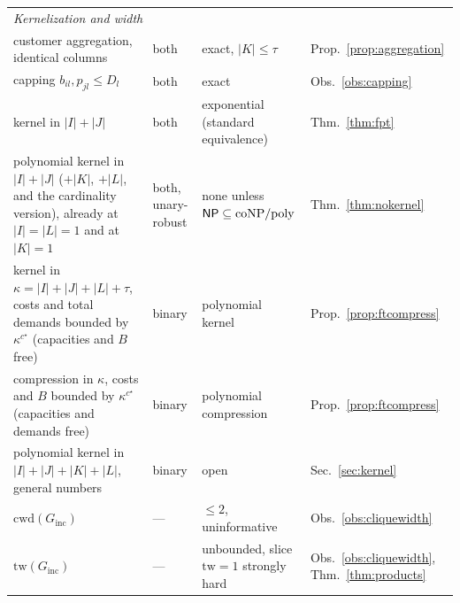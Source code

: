 \begin{longtable}{p{4.2cm}p{1.7cm}p{3.6cm}p{2.1cm}}
\midrule
\multicolumn{4}{l}{\emph{Kernelization and width}}\\
customer aggregation, identical columns & both & exact,
$|K|\le\tau$ & Prop.~\ref{prop:aggregation}\\
capping $b_{il},p_{jl}\le D_l$ & both & exact & Obs.~\ref{obs:capping}\\
kernel in $|I|+|J|$ & both & exponential (standard equivalence) &
Thm.~\ref{thm:fpt}\\
polynomial kernel in $|I|+|J|$ ($+|K|$, $+|L|$, and the cardinality
version), already at $|I|=|L|=1$ and at $|K|=1$ & both, unary-robust &
none unless $\textsf{NP}\subseteq\mathrm{coNP}/\mathrm{poly}$ &
Thm.~\ref{thm:nokernel}\\
kernel in $\kappa=|I|+|J|+|L|+\tau$, costs and total demands bounded
by $\kappa^{c^\star}$ (capacities and $B$ free) & binary &
polynomial kernel & Prop.~\ref{prop:ftcompress}\\
compression in $\kappa$, costs and $B$ bounded by $\kappa^{c^\star}$
(capacities and demands free) & binary &
polynomial compression & Prop.~\ref{prop:ftcompress}\\
polynomial kernel in $|I|+|J|+|K|+|L|$, general numbers & binary & open &
Sec.~\ref{sec:kernel}\\
$\mathrm{cwd}(G_{\mathrm{inc}})$ & --- & $\le 2$, uninformative &
Obs.~\ref{obs:cliquewidth}\\
$\mathrm{tw}(G_{\mathrm{inc}})$ & --- & unbounded, slice $\mathrm{tw}=1$
strongly hard & Obs.~\ref{obs:cliquewidth},
Thm.~\ref{thm:products}\\
\end{longtable}
\endgroup
